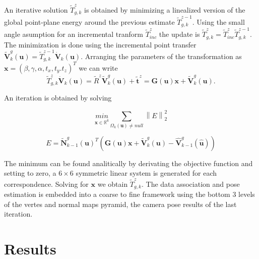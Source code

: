An iterative solution $\tilde{T}^z_{g,k}$ is obtained by minimizing a linealized version of the global point-plane energy around the previous estimate $\tilde{T}^{z-1}_{g,k}$. Using the small angle asumption for an incremental tranform $\tilde{T}^z_{inc}$ the update is $\tilde{T}^z_{g,k} = \tilde{T}^z_{inc}\tilde{T}^{z-1}_{g,k}$.
The minimization is done using the incremental point transfer $\tilde{\mathbf{V}}^g_k(\mathbf{u}) = \tilde{T}^{z-1}_{g,k} \dot{\mathbf{V}}_k(\mathbf{u})$. 
Arranging the parameters of the transformation as $ \mathbf{x} = (\beta,\gamma,\alpha,t_x,t_y.t_z)^T$ we can write
\begin{equation}
\tilde{T}^z_{g,k} \dot{\mathbf{V}}_k(\mathbf{u}) = \tilde{R}^z \tilde{\mathbf{V}}^g_k(\mathbf{u}) + \tilde{\mathbf{t}}^z = \mathbf{G}(\mathbf{u})\mathbf{x} + \tilde{\mathbf{V}}^g_k(\mathbf{u}).
\end{equation}

An iteration is obtained by solving

\begin{equation}
\underset{\mathbf{x} \in  \mathbb{R}^6 }{min} \sum_{\Omega_k (\mathbf{u}) \neq null} \left \| E \right \|^2_2
\end{equation}

\begin{equation}
 E = \tilde{\mathbf{N}}^g_{k-1}(\mathbf{u})^T \left( \mathbf{G}(\mathbf{u})\mathbf{x} + \tilde{\mathbf{V}}^g_k(\mathbf{u}) - \hat{\mathbf{V}}^g_{k-1}(\hat{\mathbf{u}}) \right)
\end{equation}

The minimum can be found analitically by derivating the objective function and setting to zero, a $6 \times 6$ symmetric linear system is generated for each correspondence. Solving for $\mathbf{x}$ we obtain $\tilde{T}^z_{g,k}$.
The data association and pose estimation is embedded into a coarse to fine framework using the bottom 3 levels of the vertes and normal maps pyramid, the camera pose results of the last iteration.

\section{Results}

